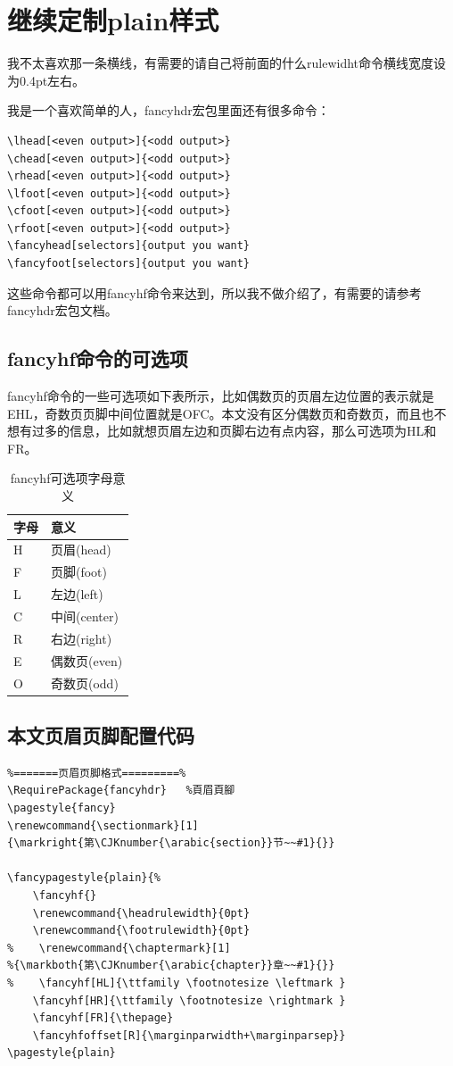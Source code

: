 \documentclass[11pt,oneside]{book}
\begin{document}
\section{继续定制plain样式}
我不太喜欢那一条横线，有需要的请自己将前面的什么rulewidht命令横线宽度设为0.4pt左右。

我是一个喜欢简单的人，fancyhdr宏包里面还有很多命令：
\vspace{-20pt}
\begin{Verbatim}
\lhead[<even output>]{<odd output>}
\chead[<even output>]{<odd output>}
\rhead[<even output>]{<odd output>}
\lfoot[<even output>]{<odd output>}
\cfoot[<even output>]{<odd output>}
\rfoot[<even output>]{<odd output>}
\fancyhead[selectors]{output you want}
\fancyfoot[selectors]{output you want}
\end{Verbatim}
这些命令都可以用fancyhf命令来达到，所以我不做介绍了，有需要的请参考fancyhdr宏包文档。

\subsection{fancyhf命令的可选项}
fancyhf命令的一些可选项如下表所示，比如偶数页的页眉左边位置的表示就是EHL，奇数页页脚中间位置就是OFC。本文没有区分偶数页和奇数页，而且也不想有过多的信息，比如就想页眉左边和页脚右边有点内容，那么可选项为HL和FR。
\begin{table}[H]
\centering
\begin{tabular}{@{}ll@{}}
\toprule
字母 & 意义  \\ \midrule
H  & 页眉(head)  \\
F  & 页脚(foot)  \\
L  & 左边(left)  \\
C  & 中间(center)  \\
R  & 右边(right)  \\
E  & 偶数页(even) \\
O  & 奇数页(odd) \\ \bottomrule
\end{tabular}
\label{tab:fancyhf可选项字母意义}
\caption{fancyhf可选项字母意义}
\end{table}


\subsection{本文页眉页脚配置代码}
\begin{Verbatim}
%=======页眉页脚格式=========%
\RequirePackage{fancyhdr}   %頁眉頁腳
\pagestyle{fancy}
\renewcommand{\sectionmark}[1]
{\markright{第\CJKnumber{\arabic{section}}节~~#1}{}}

\fancypagestyle{plain}{%
    \fancyhf{}
    \renewcommand{\headrulewidth}{0pt}
    \renewcommand{\footrulewidth}{0pt}
%    \renewcommand{\chaptermark}[1]
%{\markboth{第\CJKnumber{\arabic{chapter}}章~~#1}{}}
%    \fancyhf[HL]{\ttfamily \footnotesize \leftmark }
    \fancyhf[HR]{\ttfamily \footnotesize \rightmark }
    \fancyhf[FR]{\thepage}
    \fancyhfoffset[R]{\marginparwidth+\marginparsep}}
\pagestyle{plain}
\end{Verbatim}
\end{document}
